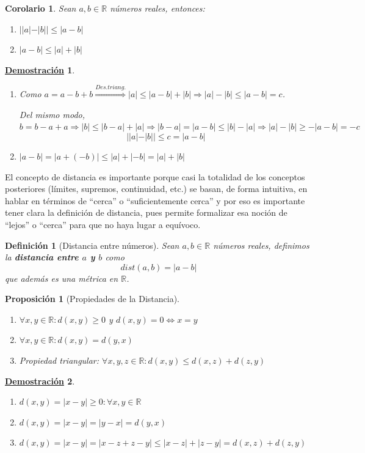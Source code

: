 \documentclass[10pt,a4paper,openright]{book}
\theoremstyle{break}
\newtheorem{defi}{Definición}[chapter]
\newtheorem{coro}{Corolario}[theo]
\newtheorem{prop}{Proposición}[chapter]
\newtheorem*{demo}{\underline{Demostración}}
\begin{document}
\begin{coro}
Sean $a,b\in \mathbb{R}$ números reales, entonces:
\begin{enumerate}
\item $||a|-|b||\leq |a-b|$
\item $|a-b|\leq |a|+|b|$
\end{enumerate}
\end{coro}
\begin{demo}
\begin{enumerate}
\item Como $a=a-b+b\stackrel{Des.triang.}{\Rightarrow} |a|\leq |a-b|+|b|\Rightarrow |a|-|b|\leq |a-b|=c$.\par
Del mismo modo, $b=b-a+a\Rightarrow |b|\leq |b-a|+|a|\Rightarrow |b-a|=|a-b|\leq |b|-|a|\Rightarrow |a|-|b|\geq -|a-b|=-c$
$$||a|-|b||\leq c=|a-b|$$

\item $|a-b|=|a+(-b)|\leq |a|+|-b|=|a|+|b|$
\end{enumerate}
\end{demo}


El concepto de distancia es importante porque casi la totalidad de los conceptos posteriores (límites, supremos, continuidad, etc.) se basan, de forma intuitiva, en hablar en términos de ``cerca'' o ``suficientemente cerca'' y por eso es importante tener clara la definición de distancia, pues permite formalizar esa noción de ``lejos'' o ``cerca'' para que no haya lugar a equívoco.

\begin{defi}[Distancia entre números]
Sean $a,b\in \mathbb{R}$ números reales, definimos la \textbf{distancia entre $a$ y $b$} como
\[
dist(a,b)=|a-b|
\]
que además es una métrica en $\mathbb{R}$.
\end{defi}

\begin{prop}[Propiedades de la Distancia]
\begin{enumerate}
\item $\forall x,y\in \mathbb R: d(x,y)\geq 0$ y $d(x,y)=0\Leftrightarrow x=y$

\item $\forall x,y\in \mathbb R: d(x,y)=d(y,x)$

\item Propiedad triangular: $\forall x,y,z\in \mathbb R : d(x,y)\leq d(x,z)+d(z,y)$
\end{enumerate}
\end{prop}
\begin{demo}
\begin{enumerate}
\item $d(x,y)=|x-y|\geq 0 : \forall x,y\in \mathbb R$

\item $d(x,y)=|x-y|=|y-x|=d(y,x)$

\item $d(x,y)=|x-y|=|x-z+z-y|\leq |x-z|+|z-y|=d(x,z)+d(z,y)$
\end{enumerate}
\end{demo}
\end{document}
